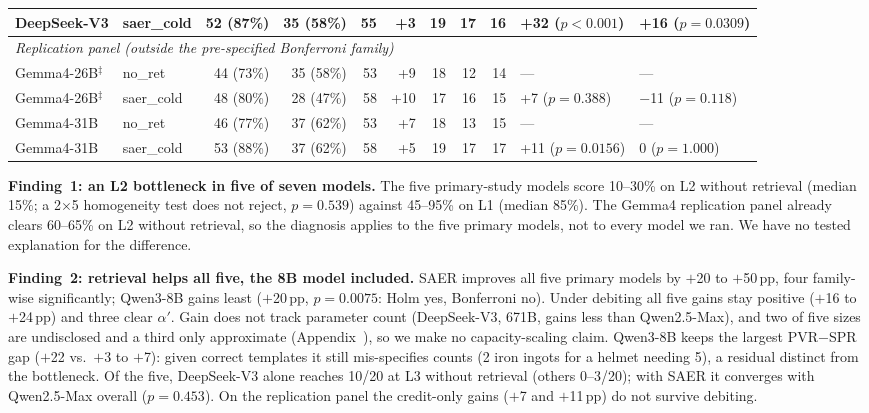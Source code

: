 \documentclass[letterpaper]{article} %
\newcommand{\appref}[1]{Appendix~\getrefnumber{#1}}
\begin{document}
\begin{table}[tbp]
\begin{tabular}{llrrrrrrrll}
DeepSeek-V3    & saer\_cold & 52 (87\%) & 35 (58\%) & 55 & +3  & 19 & 17 & 16 & \textbf{+32} ($p{<}0.001$) & +16 ($p{=}0.0309$) \\
\midrule
\multicolumn{11}{l}{\emph{Replication panel (outside the pre-specified Bonferroni family)}} \\
\addlinespace[2pt]
Gemma4-26B$^{\ddagger}$ & no\_ret    & 44 (73\%) & 35 (58\%) & 53 & +9  & 18 & 12 & 14 & --- & --- \\
Gemma4-26B$^{\ddagger}$ & saer\_cold & 48 (80\%) & 28 (47\%) & 58 & +10 & 17 & 16 & 15 & +7 ($p{=}0.388$) & $-$11 ($p{=}0.118$) \\
\addlinespace
Gemma4-31B & no\_ret    & 46 (77\%) & 37 (62\%) & 53 & +7  & 18 & 13 & 15 & --- & --- \\
Gemma4-31B & saer\_cold & 53 (88\%) & 37 (62\%) & 58 & +5  & 19 & 17 & 17 & +11 ($p{=}0.0156$) & 0 ($p{=}1.000$) \\
\bottomrule
\end{tabular}
\renewcommand{\arraystretch}{1}
\end{table}

\noindent\textbf{Finding~1: an L2 bottleneck in five of seven models.}  The
five primary-study models score 10--30\% on L2 without retrieval (median
15\%; a 2$\times$5 homogeneity test does not reject, $p{=}0.539$) against
45--95\% on L1 (median 85\%).  The Gemma4 replication panel already clears
60--65\% on L2 without retrieval, so the diagnosis applies to the five primary
models, not to every model we ran.  We have no tested explanation for the difference.

\noindent\textbf{Finding~2: retrieval helps all five, the 8B model
included.}  SAER improves all five primary models by $+$20 to $+$50\,pp, four
family-wise significantly; Qwen3-8B gains least ($+$20\,pp, $p{=}0.0075$:
Holm yes, Bonferroni no).  Under debiting all five gains stay positive
($+$16 to $+$24\,pp) and three clear $\alpha'$.  Gain does not track parameter
count (DeepSeek-V3, 671B, gains less than Qwen2.5-Max), and two of five sizes are undisclosed and a third only approximate
(\appref{app:models}), so we make no capacity-scaling claim.  Qwen3-8B keeps
the largest PVR$-$SPR gap ($+$22 vs.\ $+$3 to $+$7): given correct templates it
still mis-specifies counts (2 iron ingots for a helmet needing 5), a residual
distinct from the bottleneck.  Of the five, DeepSeek-V3 alone reaches 10/20 at L3 without
retrieval (others 0--3/20); with SAER it converges with Qwen2.5-Max
overall ($p{=}0.453$).  On the replication panel the credit-only gains
($+$7 and $+$11\,pp) do not survive debiting.
\end{document}
